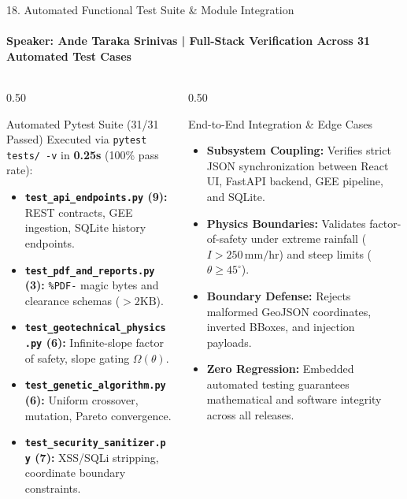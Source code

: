\documentclass[aspectratio=169, 11pt]{beamer}
\begin{document}
\begin{frame}{18. Automated Functional Test Suite \& Module Integration}
    \framesubtitle{\textbf{\textcolor{amritaGold}{Speaker: Ande Taraka Srinivas}} \quad | \quad Full-Stack Verification Across 31 Automated Test Cases}
    \begin{columns}[c]
        \begin{column}{0.50\textwidth}
            \begin{block}{Automated Pytest Suite (31/31 Passed)}
                \fontsize{6.8pt}{8.2pt}\selectfont
                Executed via \texttt{pytest tests/ -v} in \textbf{0.25s} (100\% pass rate):
                \begin{itemize}
                    \setlength{\itemsep}{1pt}
                    \item \textbf{\texttt{test\_api\_endpoints.py} (9):} REST contracts, GEE ingestion, SQLite history endpoints.
                    \item \textbf{\texttt{test\_pdf\_and\_reports.py} (3):} \texttt{\%PDF-} magic bytes and clearance schemas ($>2\text{KB}$).
                    \item \textbf{\texttt{test\_geotechnical\_physics.py} (6):} Infinite-slope factor of safety, slope gating $\Omega(\theta)$.
                    \item \textbf{\texttt{test\_genetic\_algorithm.py} (6):} Uniform crossover, mutation, Pareto convergence.
                    \item \textbf{\texttt{test\_security\_sanitizer.py} (7):} XSS/SQLi stripping, coordinate boundary constraints.
                \end{itemize}
            \end{block}
        \end{column}
        \begin{column}{0.50\textwidth}
            \begin{exampleblock}{End-to-End Integration \& Edge Cases}
                \fontsize{6.8pt}{8.2pt}\selectfont
                \begin{itemize}
                    \setlength{\itemsep}{1.5pt}
                    \item \textbf{Subsystem Coupling:} Verifies strict JSON synchronization between React UI, FastAPI backend, GEE pipeline, and SQLite.
                    \item \textbf{Physics Boundaries:} Validates factor-of-safety under extreme rainfall ($I > 250\,\text{mm/hr}$) and steep limits ($\theta \ge 45^\circ$).
                    \item \textbf{Boundary Defense:} Rejects malformed GeoJSON coordinates, inverted BBoxes, and injection payloads.
                    \item \textbf{Zero Regression:} Embedded automated testing guarantees mathematical and software integrity across all releases.
                \end{itemize}
            \end{exampleblock}
        \end{column}
    \end{columns}
\end{frame}
\end{document}
